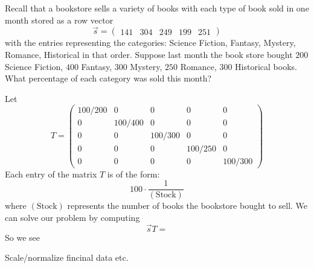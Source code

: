 \documentclass{ximera}
\begin{document}
\begin{example}
  Recall that a bookstore sells a variety of books with each type of
  book sold in one month stored as a row vector
  \[
  \vec{s} = \begin{pmatrix}141 & 304 & 249 & 199 & 251 \end{pmatrix}
  \]
  with the entries representing the categories: Science Fiction,
  Fantasy, Mystery, Romance, Historical in that order.  Suppose last
  month the book store bought $200$ Science Fiction, $400$ Fantasy, $300$
  Mystery, $250$ Romance, $300$ Historical books. What percentage of each
  category was sold this month?
  \begin{solution}
    Let
    \[
    T =
    \begin{pmatrix}
      100/200 & 0 &    0   &   0    &   0 \\
      0 & 100/400 &    0   &   0    &   0 \\
      0 &   0   &  100/300 &   0    &   0 \\
      0 &   0   &    0   & 100/250  &   0 \\
      0 &   0   &    0   &   0    & 100/300
    \end{pmatrix}
    \]
    Each entry of the matrix $T$ is of the form:
    \[
    100 \cdot \frac{1}{(\text{Stock})}
    \]
    where $(\text{Stock})$ represents the number of books the
    bookstore bought to sell.  We can solve our problem by computing
    \[
    \vec{s} T =
    \]
    So we see
  \end{solution}

\end{example}




\begin{example}[Navigation]
  Scale/normalize fincinal data etc.
\end{example}
\end{document}
